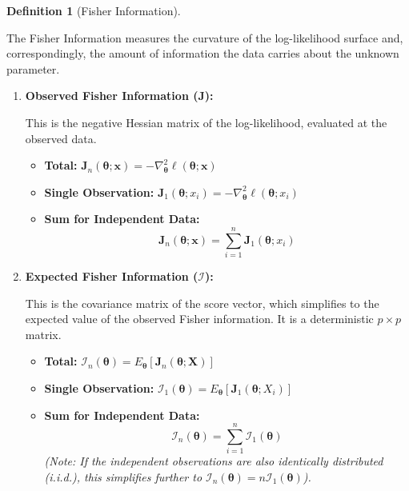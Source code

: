 \documentclass[
  letterpaper,
  DIV=11,
  numbers=noendperiod]{scrreprt}
\providecommand{\tightlist}{%
  \setlength{\itemsep}{0pt}\setlength{\parskip}{0pt}}
\renewcommand{\[}{\begin{equation}}
\renewcommand{\]}{\end{equation}}
\theoremstyle{definition}
\newtheorem{definition}{Definition}[chapter]
\theoremstyle{plain}
\theoremstyle{plain}
\theoremstyle{plain}
\theoremstyle{definition}
\theoremstyle{plain}
\theoremstyle{remark}
\begin{document}
\begin{definition}[Fisher
Information]\protect\hypertarget{def-fisher-info}{}\label{def-fisher-info}

The Fisher Information measures the curvature of the log-likelihood
surface and, correspondingly, the amount of information the data carries
about the unknown parameter.

\begin{enumerate}
\def\labelenumi{\arabic{enumi}.}
\item
  \textbf{Observed Fisher Information (\(\mathbf{J}\)):}

  This is the negative Hessian matrix of the log-likelihood, evaluated
  at the observed data.

  \begin{itemize}
  \tightlist
  \item
    \textbf{Total:}
    \(\mathbf{J}_n(\boldsymbol{\theta}; \mathbf{x}) = - \nabla^2_{\boldsymbol{\theta}} \ell(\boldsymbol{\theta}; \mathbf{x})\)
  \item
    \textbf{Single Observation:}
    \(\mathbf{J}_1(\boldsymbol{\theta}; x_i) = - \nabla^2_{\boldsymbol{\theta}} \ell(\boldsymbol{\theta}; x_i)\)
  \item
    \textbf{Sum for Independent Data:} \[
    \mathbf{J}_n(\boldsymbol{\theta}; \mathbf{x}) = \sum_{i=1}^n \mathbf{J}_1(\boldsymbol{\theta}; x_i)
    \]
  \end{itemize}
\item
  \textbf{Expected Fisher Information (\(\mathcal{I}\)):}

  This is the covariance matrix of the score vector, which simplifies to
  the expected value of the observed Fisher information. It is a
  deterministic \(p \times p\) matrix.

  \begin{itemize}
  \tightlist
  \item
    \textbf{Total:}
    \(\mathcal{I}_n(\boldsymbol{\theta}) = E_{\boldsymbol{\theta}} \left[ \mathbf{J}_n(\boldsymbol{\theta}; \mathbf{X}) \right]\)
  \item
    \textbf{Single Observation:}
    \(\mathcal{I}_1(\boldsymbol{\theta}) = E_{\boldsymbol{\theta}} \left[ \mathbf{J}_1(\boldsymbol{\theta}; X_i) \right]\)
  \item
    \textbf{Sum for Independent Data:} \[
    \mathcal{I}_n(\boldsymbol{\theta}) = \sum_{i=1}^n \mathcal{I}_1(\boldsymbol{\theta})
    \] \emph{(Note: If the independent observations are also identically
    distributed (i.i.d.), this simplifies further to
    \(\mathcal{I}_n(\boldsymbol{\theta}) = n \mathcal{I}_1(\boldsymbol{\theta})\)).}
  \end{itemize}
\end{enumerate}

\end{definition}
\end{document}
